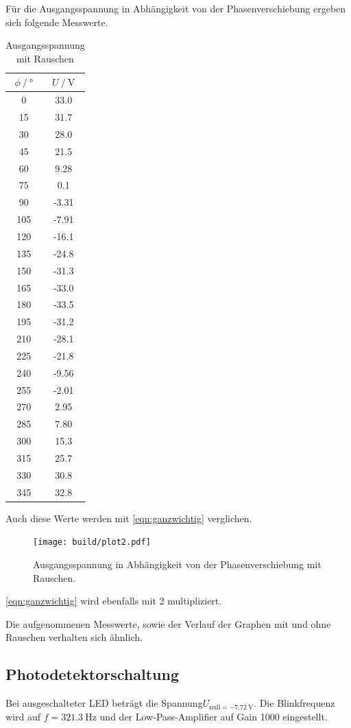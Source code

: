 Für die Ausgangsspannung in Abhängigkeit von der Phasenverschiebung ergeben sich folgende Messwerte.
\begin{table}
  \centering
  \caption{Ausgangsspannung mit Rauschen}
  \label{tab:ohne_Rauschen}
  \begin{tabular}{cc}
    \toprule {$\phi \:/\: °$} & {$U \:/\: \si{\volt}$} \\
    \midrule
    0	& 33.0 \\
    15 & 31.7 \\
    30 & 28.0 \\
    45	& 21.5 \\
    60 & 9.28 \\
    75 & 0.1 \\
    90	& -3.31 \\
    105 & -7.91 \\
    120	& -16.1 \\
    135	& -24.8 \\
    150	& -31.3 \\
    165 & -33.0 \\
    180	& -33.5 \\
    195	& -31.2 \\
    210	& -28.1 \\
    225	& -21.8 \\
    240 & -9.56 \\
    255	& -2.01 \\
    270	& 2.95 \\
    285	& 7.80 \\
    300	& 15.3 \\
    315	& 25.7 \\
    330	& 30.8 \\
    345	& 32.8 \\
    \bottomrule
    \end{tabular}
\end{table}

Auch diese Werte werden mit \ref{eqn:ganzwichtig} verglichen.
\begin{figure}
  \centering
  \texttt{[image: build/plot2.pdf]}
\caption{Ausgangsspannung in Abhängigkeit von der Phasenverschiebung mit Rauschen.}
  \label{fig:mit_rauschen}
\end{figure}
\ref{eqn:ganzwichtig} wird ebenfalls mit 2 multipliziert.

Die aufgenommenen Messwerte, sowie der Verlauf der Graphen mit und ohne Rauschen verhalten sich ähnlich.
\newpage
\subsection{Photodetektorschaltung}
Bei ausgeschalteter LED beträgt die Spannung$U_{\mathrm{null} = \SI {-7,72}{\volt}}$.
Die Blinkfrequenz wird auf $f = \SI {321,3}{\Hz}$ und der Low-Pass-Amplifier auf Gain 1000 eingestellt.

